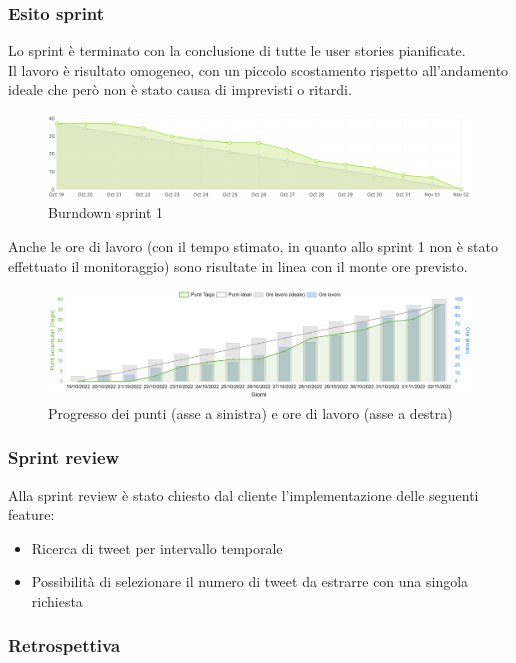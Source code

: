 \subsubsection{Esito sprint}
Lo sprint è terminato con la conclusione di tutte le user stories pianificate.\\
Il lavoro è risultato omogeneo, con un piccolo scostamento rispetto all'andamento ideale 
che però non è stato causa di imprevisti o ritardi.\\
\begin{figure}[H]
    \centering
    \includegraphics[width=15cm]{./img/sprint1/burndown.png}
    \caption{Burndown sprint 1}
\end{figure}
Anche le ore di lavoro (con il tempo stimato, in quanto allo sprint 1 non è stato effettuato il monitoraggio) sono risultate in linea con il monte ore previsto.\\
\begin{figure}[H]
    \centering
    \includegraphics[width=15cm]{./img/sprint1/worktime.png}
    \caption{Progresso dei punti (asse a sinistra) e ore di lavoro (asse a destra)}
\end{figure}


\subsubsection{Sprint review}
Alla sprint review è stato chiesto dal cliente l'implementazione delle seguenti feature:
\begin{itemize}
    \item Ricerca di tweet per intervallo temporale
    \item Possibilità di selezionare il numero di tweet da estrarre con una singola richiesta
\end{itemize}


\subsubsection{Retrospettiva}
